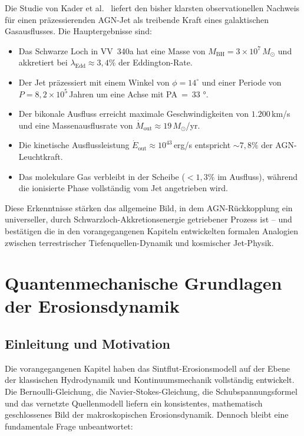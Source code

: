 ﻿\documentclass[12pt,a4paper]{report}
\begin{document}
Die Studie von Kader et al.\ \cite{kader2026} liefert den bisher klarsten observationellen Nachweis für einen präzessierenden AGN-Jet als treibende Kraft eines galaktischen Gasausflusses. Die Hauptergebnisse sind:

\begin{itemize}
	\item Das Schwarze Loch in VV~340a hat eine Masse von $M_\mathrm{BH} = 3 \times 10^7\,M_\odot$ und akkretiert bei $\lambda_\mathrm{Edd} \approx 3{,}4\%$ der Eddington-Rate.
	\item Der Jet präzessiert mit einem Winkel von $\phi = 14^\circ$ und einer Periode von $P = 8{,}2 \times 10^5$\,Jahren um eine Achse mit PA~=~33 °.
	\item Der bikonale Ausfluss erreicht maximale Geschwindigkeiten von $1.200$\,km/s und eine Massenausflusrate von $\dot{M}_\mathrm{out} \approx 19\,M_\odot$/yr.
	\item Die kinetische Ausflussleistung $\dot{E}_\mathrm{out} \approx 10^{43}$\,erg/s entspricht $\sim 7{,}8\%$ der AGN-Leuchtkraft.
	\item Das molekulare Gas verbleibt in der Scheibe ($<1{,}3\%$ im Ausfluss), während die ionisierte Phase vollständig vom Jet angetrieben wird.
\end{itemize}

Diese Erkenntnisse stärken das allgemeine Bild, in dem AGN-Rückkopplung ein universeller, durch Schwarzloch-Akkretionsenergie getriebener Prozess ist -- und bestätigen die in den vorangegangenen Kapiteln entwickelten formalen Analogien zwischen terrestrischer Tiefenquellen-Dynamik und kosmischer Jet-Physik.


\chapter{Quantenmechanische Grundlagen der Erosionsdynamik}
\label{chap:quanten_erosion}

\section{Einleitung und Motivation}

Die vorangegangenen Kapitel haben das Sintflut-Erosionsmodell auf der Ebene der klassischen Hydrodynamik und Kontinuumsmechanik vollständig entwickelt. Die Bernoulli-Gleichung, die Navier-Stokes-Gleichung, die Schubspannungsformel und das vernetzte Quellenmodell liefern ein konsistentes, mathematisch geschlossenes Bild der makroskopischen Erosionsdynamik. Dennoch bleibt eine fundamentale Frage unbeantwortet:
\end{document}
